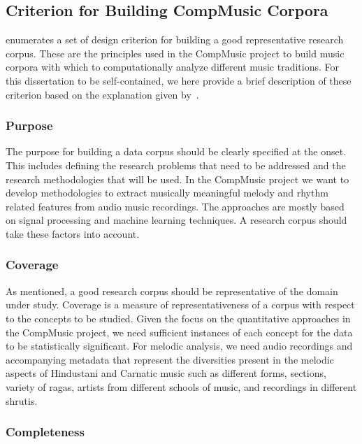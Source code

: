 \subsection{Criterion for Building CompMusic Corpora}
\label{sec:corpus_criterion_for_corpora}

\cite{serra:14:corpus} enumerates a set of design criterion for building a good representative research corpus. These are the principles used in the CompMusic project to build music corpora with which to computationally analyze different music traditions. For this dissertation to be self-contained, we here provide a brief description of these criterion based on the explanation given by~\cite{serra:14:corpus}.

\subsubsection{Purpose}

The purpose for building a data corpus should be clearly specified at the onset. This includes defining the research problems that need to be addressed and the research methodologies that will be used. In the CompMusic project we want to develop methodologies to extract musically meaningful melody and rhythm related features from audio music recordings. The approaches are mostly based on signal processing and machine learning techniques. A research corpus should take these factors into account.

\subsubsection{Coverage}

As mentioned, a good research corpus should be representative of the domain under study. Coverage is a measure of representativeness of a corpus with respect to the concepts to be studied. Given the focus on the quantitative approaches in the CompMusic project, we need sufficient instances of each concept for the data to be statistically significant. For melodic analysis, we need audio recordings and accompanying metadata that represent the diversities present in the melodic aspects of Hindustani and Carnatic music such as different forms, sections, variety of \glspl{raga}, artists from different schools of music, and recordings in different \glspl{shruti}. 

\subsubsection{Completeness}

